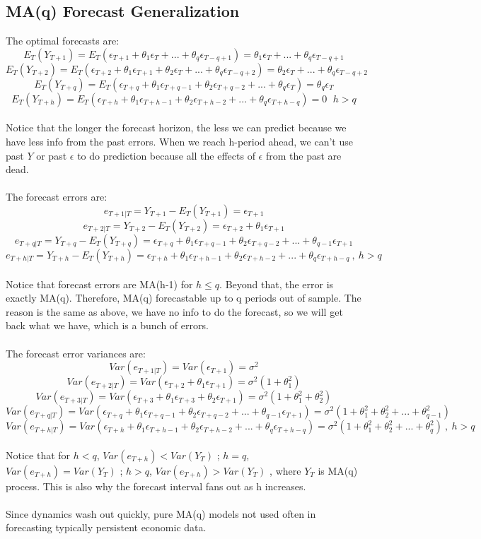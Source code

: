 \documentclass{article}
\begin{document}
\subsection{MA(q) Forecast Generalization}
The optimal forecasts are:
$$E_T(Y_{T+1}) = E_T(\epsilon_{T+1} + \theta_1\epsilon_T + ... + \theta_q\epsilon_{T-q+1}) = \theta_1\epsilon_T + ... + \theta_q\epsilon_{T-q+1}$$
$$E_T(Y_{T+2}) = E_T(\epsilon_{T+2} + \theta_1\epsilon_{T+1} + \theta_2\epsilon_{T} + ... + \theta_q\epsilon_{T-q+2}) =\theta_2\epsilon_{T} + ... + \theta_q\epsilon_{T-q+2}$$
$$E_T(Y_{T+q}) = E_T(\epsilon_{T+q} + \theta_1\epsilon_{T+q-1} + \theta_2\epsilon_{T+q-2} + ... + \theta_q\epsilon_{T}) = \theta_q\epsilon_T$$
$$E_T(Y_{T+h}) = E_T(\epsilon_{T+h} + \theta_1\epsilon_{T+h-1} + \theta_2\epsilon_{T+h-2} + ... + \theta_q\epsilon_{T+h-q}) = 0\ \, \ h>q$$\\
Notice that the longer the forecast horizon, the less we can predict because we have less info from the past errors. When we reach h-period ahead, we can't use past $Y$ or past $\epsilon$ to do prediction because all the effects of $\epsilon$ from the past are dead.\\
\\
The forecast errors are:
$$e_{T+1|T} = Y_{T+1} - E_T(Y_{T+1}) = \epsilon_{T+1}$$
$$e_{T+2|T} = Y_{T+2} - E_T(Y_{T+2}) = \epsilon_{T+2} + \theta_1\epsilon_{T+1}$$
$$e_{T+q|T} = Y_{T+q} - E_T(Y_{T+q}) = \epsilon_{T+q} + \theta_1\epsilon_{T+q-1} + \theta_2\epsilon_{T+q-2} + ... + \theta_{q-1}\epsilon_{T+1}$$
$$e_{T+h|T} = Y_{T+h} - E_T(Y_{T+h}) = \epsilon_{T+h} + \theta_1\epsilon_{T+h-1} + \theta_2\epsilon_{T+h-2} + ... + \theta_{q}\epsilon_{T+h-q}\ , \ h>q$$\\
Notice that forecast errors are MA(h-1) for $h\leq q$. Beyond that, the error is exactly MA(q). Therefore, MA(q) forecastable up to q periods out of sample. The reason is the same as above, we have no info to do the forecast, so we will get back what we have, which is a bunch of errors.\\
\\
The forecast error variances are:
$$Var(e_{T+1|T}) = Var(\epsilon_{T+1}) = \sigma^2$$
$$Var(e_{T+2|T}) = Var(\epsilon_{T+2} + \theta_1\epsilon_{T+1}) = \sigma^2(1 + \theta_1^2)$$
$$Var(e_{T+3|T}) = Var(\epsilon_{T+3} + \theta_1\epsilon_{T+3} + \theta_2\epsilon_{T+1}) = \sigma^2(1 + \theta_1^2 + \theta_2^2)$$
$$Var(e_{T+q|T}) = Var(\epsilon_{T+q} + \theta_1\epsilon_{T+q-1} + \theta_2\epsilon_{T+q-2} + ... + \theta_{q-1}\epsilon_{T+1}) = \sigma^2(1 + \theta_1^2 + \theta_2^2 + ... + \theta_{q-1}^2)$$
$$Var(e_{T+h|T}) = Var(\epsilon_{T+h} + \theta_1\epsilon_{T+h-1} + \theta_2\epsilon_{T+h-2} + ... + \theta_{q}\epsilon_{T+h-q}) = \sigma^2(1 + \theta_1^2 + \theta_2^2 + ... + \theta_{q}^2)\ , \ h>q$$\\
Notice that for $h<q$, $Var(e_{T+h}) < Var(Y_T)$ ; $h=q$, $Var(e_{T+h}) = Var(Y_T)$ ; $h>q$, $Var(e_{T+h}) > Var(Y_T)$ , where $Y_T$ is MA(q) process. This is also why the forecast interval fans out as h increases.\\
\\
Since dynamics wash out quickly, pure MA(q) models not used often in forecasting typically persistent economic data.
\end{document}
